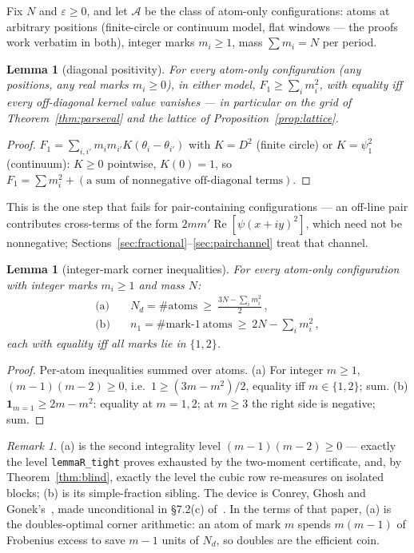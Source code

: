 \documentclass[11pt]{article}
\theoremstyle{plain}
\newtheorem{lemma}[theorem]{Lemma}
\theoremstyle{definition}
\theoremstyle{remark}
\newtheorem*{remk}{Remark}
\newcommand{\Nd}{N_{d}}
\newcommand{\one}{\mathbf{1}}
\begin{document}
Fix $N$ and $\varepsilon \ge 0$, and let $\mathcal{A}$ be the class of atom-only
configurations: atoms at arbitrary positions (finite-circle or continuum model,
flat windows --- the proofs work verbatim in both), integer marks $m_i \ge 1$,
mass $\sum m_i = N$ per period.

\begin{lemma}[diagonal positivity]
\label{lem:diagpos}
For every atom-only configuration (any positions, any real marks $m_i \ge 0$), in
either model, $F_1 \ge \sum_i m_i^2$, with equality iff every off-diagonal kernel
value vanishes --- in particular on the grid of Theorem~\ref{thm:parseval} and
the lattice of Proposition~\ref{prop:lattice}.
\end{lemma}

\begin{proof}
$F_1 = \sum_{i, i'} m_i m_{i'} K(\theta_i - \theta_{i'})$ with $K = D^2$ (finite
circle) or $K = \psi_1^2$ (continuum): $K \ge 0$ pointwise, $K(0) = 1$, so
$F_1 = \sum m_i^2 + (\text{a sum of nonnegative off-diagonal terms})$.
\end{proof}

This is the one step that fails for pair-containing configurations --- an
off-line pair contributes cross-terms of the form
$2 m m' \operatorname{Re}[\psi(x + iy)^2]$, which need not be nonnegative;
Sections~\ref{sec:fractional}--\ref{sec:pairchannel} treat that channel.

\begin{lemma}[integer-mark corner inequalities]
\label{lem:cornerineq}
For every atom-only configuration with integer marks $m_i \ge 1$ and mass $N$:
\begin{align*}
  \text{(a)} \quad &\Nd = \#\mathrm{atoms}
    \ \ge\ \frac{3N - \sum_i m_i^2}{2}\,,\\
  \text{(b)} \quad &n_1 = \#\text{mark-}1\ \mathrm{atoms}
    \ \ge\ 2N - \sum_i m_i^2 \,,
\end{align*}
each with equality iff all marks lie in $\{1, 2\}$.
\end{lemma}

\begin{proof}
Per-atom inequalities summed over atoms. (a) For integer $m \ge 1$,
$(m - 1)(m - 2) \ge 0$, i.e.\ $1 \ge (3m - m^2)/2$, equality iff
$m \in \{1, 2\}$; sum. (b) $\one_{m = 1} \ge 2m - m^2$: equality at $m = 1, 2$;
at $m \ge 3$ the right side is negative; sum.
\end{proof}

\begin{remk}
(a) is the second integrality level $(m-1)(m-2) \ge 0$ --- exactly the level
\texttt{lemmaR\_tight} proves exhausted by the two-moment certificate, and, by
Theorem~\ref{thm:blind}, exactly the level the cubic row re-measures on isolated
blocks; (b) is its simple-fraction sibling. The device is Conrey, Ghosh and
Gonek's~\cite{CGG98}, made unconditional in \S7.2(c) of~\cite{AF26}. In the
terms of that paper, (a) is the doubles-optimal corner arithmetic: an atom
of mark $m$ spends $m(m-1)$ of Frobenius excess to save $m - 1$ units of
$\Nd$, so doubles are the efficient coin.
\end{remk}
\end{document}
